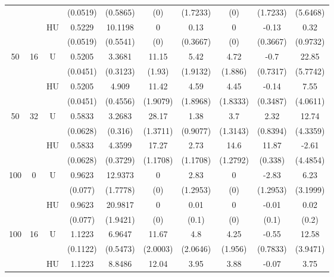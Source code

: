 \documentclass[11pt,a4paper]{article}
\begin{document}
\begin{table}[h!]
\begin{tabular}{|c|c|c|c|c|c|c|c|c|c|}
& & & (0.0519) & (0.5865) & (0) & (1.7233) & (0) & (1.7233) & (5.6468) \\
 &  & HU &0.5229 & 10.1198 & 0 & 0.13 & 0 & -0.13 & 0.32  \\
& & & (0.0519) & (0.5541) & (0) & (0.3667) & (0) & (0.3667) & (0.9732) \\
\hline %
50 & 16 & U&0.5205 & 3.3681 & 11.15 & 5.42 & 4.72 & -0.7 & 22.85  \\	
& & & (0.0451) & (0.3123) & (1.93) & (1.9132) & (1.886) & (0.7317) & (5.7742) \\
 &  &HU &0.5205 & 4.909 & 11.42 & 4.59 & 4.45 & -0.14 & 7.55  \\
& & & (0.0451) & (0.4556) & (1.9079) & (1.8968) & (1.8333) & (0.3487) & (4.0611) \\
\hline %
50 & 32 & U& 0.5833 & 3.2683 & 28.17 & 1.38 & 3.7 & 2.32 & 12.74  \\
& & & (0.0628) & (0.316) & (1.3711) & (0.9077) & (1.3143) & (0.8394) & (4.3359) \\
 &  &HU &0.5833 & 4.3599 & 17.27 & 2.73 & 14.6 & 11.87 & -2.61  \\
& & & (0.0628) & (0.3729) & (1.1708) & (1.1708) & (1.2792) & (0.338) & (4.4854) \\
\hline
\hline %
100 & 0 & U& 0.9623 & 12.9373 & 0 & 2.83 & 0 & -2.83 & 6.23  \\
& & & (0.077) & (1.7778) & (0) & (1.2953) & (0) & (1.2953) & (3.1999) \\
 &  &HU & 0.9623 & 20.9817 & 0 & 0.01 & 0 & -0.01 & 0.02  \\
& & & (0.077) & (1.9421) & (0) & (0.1) & (0) & (0.1) & (0.2) \\
\hline %
100 & 16 & U& 1.1223 & 6.9647 & 11.67 & 4.8 & 4.25 & -0.55 & 12.58  \\
& & & (0.1122) & (0.5473) & (2.0003) & (2.0646) & (1.956) & (0.7833) & (3.9471) \\
 &  &HU & 1.1223 & 8.8486 & 12.04 & 3.95 & 3.88 & -0.07 & 3.75  \\

\end{tabular}
\end{table}
\end{document}
